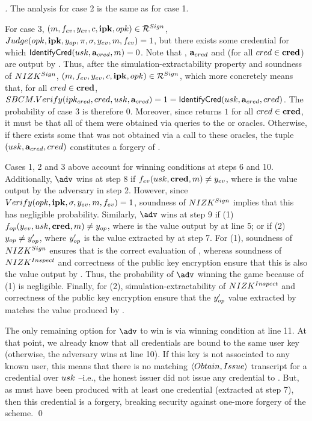 \begin{proof}[]
  The analysis for case 2 is the same as for case 1.

  For case 3, $(m,f_{ev},y_{ev},c,\mathbf{ipk},opk) \in \mathcal{R}^{Sign}$,
  $Judge(opk,\mathbf{ipk},y_{op},\pi,\sigma,y_{ev},m,f_{ev})
  = 1$, but there exists some credential \cred for which $\mathsf{IdentifyCred}(usk,
  \mathbf{a}_{cred},m)=0$. Note that \usk, $\mathbf{a}_{cred}$ and \cred (for all
  $cred \in \mathbf{cred}$) are output by \ExtractSign. Thus, after the
  simulation-extractability property and soundness of $NIZK^{Sign}$, $(m,
  f_{ev},y_{ev},c,\mathbf{ipk},opk) \in \mathcal{R}^{Sign}$, which more concretely
  means that, for all $cred \in \mathbf{cred}$, $SBCM.Verify(ipk_{cred},cred,usk,
  \mathbf{a}_{cred}) = 1 = \mathsf{IdentifyCred}(usk,\mathbf{a}_{cred},cred)$. The
  probability of case 3 is therefore $0$.
  Moreover, since \SBCMVerify returns $1$ for all $cred \in \mathbf{cred}$, it must
  be that all of them were obtained via queries to the \ISSUE or \OBTISS
  oracles. Otherwise, if there exists some \cred that was not obtained via
  a call to these oracles, the tuple $(usk, \mathbf{a}_{cred}, cred)$ constitutes
  a forgery of \SBCM.

  Cases 1, 2 and 3 above account for winning conditions at steps 6 and 10.
  Additionally, $\adv$ wins at step 8 if $f_{ev}(usk,\mathbf{cred},m) \neq y_{ev}$,
  where \yeval is the value output by the adversary in step 2. However, since
  $Verify(opk,\mathbf{ipk},\sigma,y_{ev},m,f_{ev}) = 1$, soundness of $NIZK^{Sign}$
  implies that this has negligible probability.
  Similarly, $\adv$ wins at step 9 if (1) $f_{op}(y_{ev},usk,\mathbf{cred},m) \neq
  y_{op}$, where \yinsp is the value output by \Inspect at line 5; or if (2)
  $y_{op} \neq y_{op}'$, where $y_{op}'$ is the value extracted by \ExtractSign
  at step 7. For (1), soundness of $NIZK^{Sign}$ ensures that \yinsp is the
  correct evaluation of \finsp, whereas soundness of $NIZK^{Inspect}$ and
  correctness of the public key encryption ensure that this is also the value
  output by \Inspect. Thus, the probability of $\adv$ winning the game because
  of (1) is negligible. Finally, for (2), simulation-extractability of
  $NIZK^{Inspect}$ and correctness of the public key encryption ensure that
  the $y_{op}'$ value extracted by \NIZKExtract matches the value produced by
  \Inspect.

  The only remaining option for $\adv$ to win is via winning condition at line
  11. At that point, we already know that all credentials are bound to the same
  user key (otherwise, the adversary wins at line 10). If this key is not
  associated to any known user, this means that there is no matching $\langle
  Obtain,Issue\rangle$ transcript for a credential over $usk$ --i.e., the
  honest issuer did not issue any credential to \usk. But, as \sig must have
  been produced with at least one credential (extracted at step 7), then this
  credential is a forgery, breaking security against one-more forgery of the
  \SBCM scheme.  
  \qed
\end{proof}

